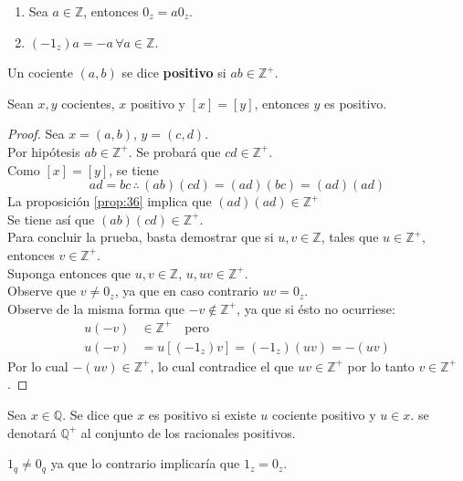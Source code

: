 \begin{remark}
  \begin{enumerate}
    \item Sea $a\in \mathbb{Z}$, entonces $0_z = a0_z$.
    \item $(-1_z)a = -a \, \forall a \in \mathbb{Z}$.
  \end{enumerate}
\end{remark}
\begin{definition}
  Un cociente $(a,b)$ se dice \textbf{positivo} si $ab \in \mathbb{Z}^+$.
\end{definition}
\begin{lemma}
  Sean $x,y$ cocientes, $x$ positivo y $[x] = [y]$, entonces $y$ es positivo.
\end{lemma}
\begin{proof}
  Sea $x = (a,b)$, $y= (c,d)$. \\
  Por hipótesis $ab \in \mathbb{Z}^+$. Se probará que $cd \in \mathbb{Z}^+$.\\
  Como $[x] = [y]$, se tiene
  \[
    ad=bc \,\therefore \, (ab)(cd) = (ad)(bc) = (ad)(ad)
  \]
  La proposición \eqref{prop:36} implica que $(ad)(ad) \in \mathbb{Z}^+$ \\
  Se tiene así que $(ab)(cd) \in \mathbb{Z}^+$.\\
  Para concluir la prueba, basta demostrar que si $u,v \in \mathbb{Z}$, tales
  que $u \in \mathbb{Z}^+$, entonces $v \in \mathbb{Z}^+$.\\
  Suponga entonces que $u,v \in \mathbb{Z}$, $u, uv \in \mathbb{Z}^+$.\\
  Observe que $v \neq 0_z$, ya que en caso contrario $uv = 0_z$.\\
  Observe de la misma forma que $-v \notin \mathbb{Z}^+$, ya que si ésto no
  ocurriese:\\
  \begin{align*}
    u(-v) &\in \mathbb{Z}^+ \quad \mathrm{ pero} \\
    u(-v) &= u[(-1_z)v] = (-1_z)(uv) = -(uv)
  \end{align*}
  Por lo cual $-(uv) \in \mathbb{Z}^+$, lo cual contradice el que $uv \in
  \mathbb{Z}^+$ por lo tanto $v \in \mathbb{Z}^+$.
\end{proof}
\begin{definition}
  Sea $x \in \mathbb{Q}$. Se dice que $x$ es positivo si existe $u$
  cociente positivo y $u \in x$. se denotará $\mathbb{Q}^+$ al conjunto de los
  racionales positivos.
\end{definition}
\begin{remark}
  $1_q \neq 0_q$ ya que lo contrario implicaría que $1_z = 0_z$.
\end{remark}
